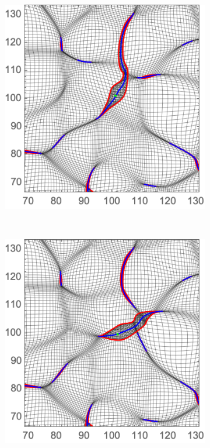\documentclass[a4paper, 11pt]{article}
\begin{document}
\begin{figure}
\begin{subfigure}[b]{0.32\textwidth}
\end{subfigure}~
\begin{subfigure}[b]{0.32\textwidth}
\includegraphics[width=\textwidth]{Rotation_Z_2}
\end{subfigure}~
\begin{subfigure}[b]{0.32\textwidth}
\includegraphics[width=\textwidth]{Rotation_Z_3}

\end{subfigure}
\end{figure}
\end{document}
